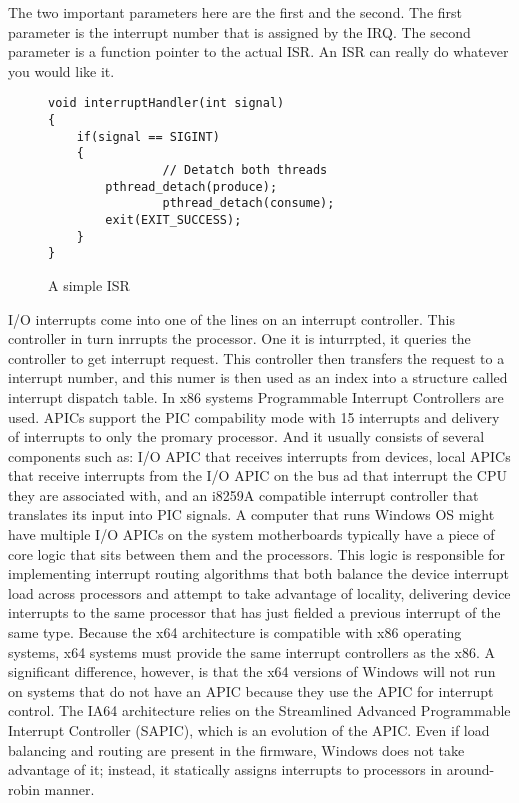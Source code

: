 \documentclass[letterpaper,10pt,draftclsnofoot,onecolumn]{IEEEtran}
\begin{document}
The two important parameters here are the first and the second. The first parameter is the interrupt number that is assigned by the IRQ. The second parameter is a function pointer to the actual ISR. An ISR can really do whatever you would like it. 

\begin{figure}[H]
\caption{A simple ISR}
\begin{lstlisting}
void interruptHandler(int signal)
{
	if(signal == SIGINT)
	{
                // Detatch both threads
		pthread_detach(produce);
                pthread_detach(consume);
		exit(EXIT_SUCCESS);
	}
}
\end{lstlisting}
\end{figure}

I/O interrupts come into one of the lines on an interrupt controller. This controller in turn inrrupts the processor. One it is inturrpted, it queries the controller to get interrupt request. This controller then transfers the request to a interrupt number, and this numer is then used as an index into a structure called interrupt dispatch table. 
In x86 systems Programmable Interrupt Controllers are used. APICs support the PIC compability mode with 15 interrupts and delivery of interrupts to only the promary processor. And it usually consists of several components such as: I/O APIC that receives interrupts from devices, local APICs that receive interrupts from the I/O APIC on the bus ad that interrupt the CPU they are associated with, and an i8259A compatible interrupt controller that translates its input into PIC signals. A computer that runs Windows OS might have multiple I/O APICs on the system motherboards typically have a piece of core logic that sits between them and the processors. 
This logic is responsible for implementing interrupt routing algorithms that both balance the device interrupt load across processors and attempt to take advantage of locality, delivering device interrupts to the same processor that has just fielded a previous interrupt of the same type.\cite{[1]}
Because the x64 architecture is compatible with x86 operating systems, x64 systems must provide the same interrupt controllers as the x86. A significant difference, however, is that the x64 versions of Windows will not run on systems that do not have an APIC because they use the APIC for interrupt control.\cite{[1]}
The IA64 architecture relies on the Streamlined Advanced Programmable Interrupt Controller (SAPIC), which is an evolution of the APIC. Even if load balancing and routing are present in the firmware, Windows does not take advantage of it; instead, it statically assigns interrupts to processors in around-robin manner.\cite{[1]}
\end{document}
